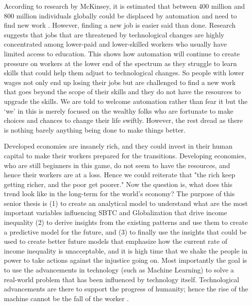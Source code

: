 \hspace{25pt} According to research by McKinsey, it is estimated that between
400 million and 800 million individuals globally could be displaced by automation and need to find new work \cite{McKinsey}. However, finding a new job is easier said than done. Research suggests that jobs that are threatened by technological changes are highly concentrated among lower-paid and lower-skilled workers who usually have limited access to education. This shows how automation will continue to create pressure on workers at the lower end of the spectrum as they struggle to learn skills that could help them adjust to technological changes. So people with lower wages not only end up losing their jobs but are challenged to find a new work that goes beyond the scope of their skills and they do not have the resources to upgrade the skills. We are told to welcome automation rather than fear it but the ‘we’ in
this is merely focused on the wealthy folks who are fortunate to make choices and chances to change their life swiftly. However, the rest dread as there is nothing barely anything being done to make things better.

Developed economies are insanely rich, and they could invest in their human capital to make their workers prepared for the transitions. Developing economies, who are still beginners in this game, do not seem to have the resources, and hence their workers are at a loss. Hence we could reiterate that "the rich keep getting richer, and the poor get poorer." Now the question is, what does this trend look like in the long-term for the world's economy? The purpose of this senior thesis is (1) to create an analytical model to understand what are the most important variables influencing SBTC and Globalization that drive income inequality (2) to derive insights from the existing patterns and use them to create a predictive model for the future, and (3) to finally use the insights that could be used to create better future models that emphasize how the current rate of income inequality is unacceptable, and it is high time that we shake the people in power to take actions against the injustice going on. Most importantly the goal is to use the advancements in technology (such as Machine Learning) to solve a real-world problem that has been influenced by technology itself. Technological advancements are there to support the progress of humanity; hence the rise of the machine cannot be the fall of the worker \cite{yglesias_2015}. 
